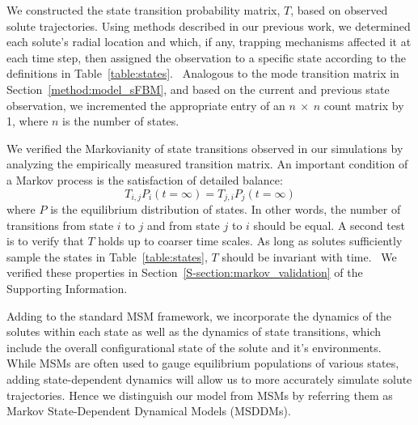 \documentclass{article}
\begin{document}
  We constructed the state transition probability matrix, $T$, based on observed solute trajectories.
  Using methods described in our previous work, we determined each solute's radial location 
  and which, if any, trapping mechanisms affected it at each time step, then assigned the 
  observation to a specific state according to the definitions in Table~\ref{table:states}.~\cite{coscia_chemically_2019}
  Analogous to the mode transition matrix in Section~\ref{method:model_sFBM}, and based on
  the current and previous state observation, we incremented the appropriate entry of an
  $n~\times~n$ count matrix by 1, where $n$ is the number of states.
  
  We verified the Markovianity of state transitions observed in our simulations 
  by analyzing the empirically measured transition matrix. An important condition
  of a Markov process is the satisfaction of detailed balance:
  \begin{equation}
  T_{i,j}P_i(t=\infty) = T_{j,i}P_j(t=\infty)
  \end{equation}
  where $P$ is the equilibrium distribution of states. In other words, the number of
  transitions from state $i$ to $j$ and from state $j$ to $i$ should be equal. A second
  test is to verify that $T$ holds up to coarser time scales. As long as solutes
  sufficiently sample the states in Table~\ref{table:states}, $T$ should be invariant
  with time.~\cite{swope_describing_2004} We verified these properties 
  in Section~\ref{S-section:markov_validation} of the Supporting Information.
  
  
  Adding to the standard MSM framework, we incorporate the dynamics of the solutes
  within each state as well as the dynamics of state transitions, which include the
  overall configurational state of the solute and it's environments. 
  While MSMs are often used to gauge equilibrium populations of various states, adding 
  state-dependent dynamics will allow us to
  more accurately simulate solute trajectories. Hence we distinguish our model from 
  MSMs by referring them as Markov State-Dependent Dynamical Models (MSDDMs). 
  
\end{document}
